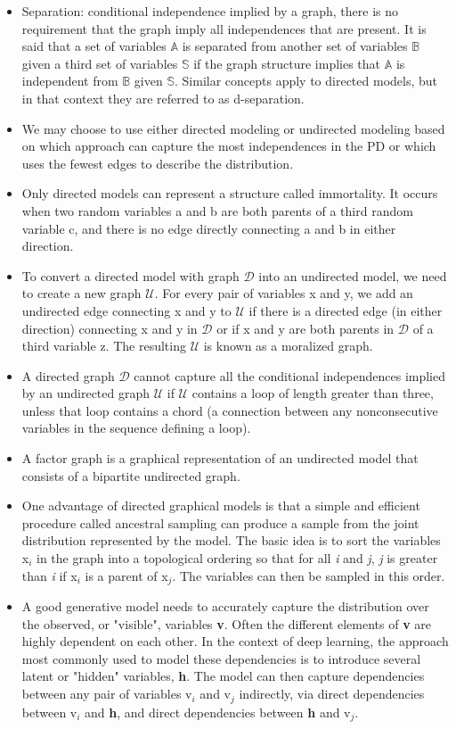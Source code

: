 \documentclass{article}
\begin{document}
\begin{itemize}
\item Separation: conditional independence implied by a graph, there is no requirement that the graph imply all independences that are present. It is said that a set of variables \(\mathbb{A}\) is separated from another set of variables \(\mathbb{B}\) given a third set of variables \(\mathbb{S}\) if the graph structure implies that \(\mathbb{A}\) is independent from \(\mathbb{B}\) given \(\mathbb{S}\). Similar concepts apply to directed models, but in that context they are referred to as d-separation.
\item We may choose to use either directed modeling or undirected modeling based on which approach can capture the most independences in the PD or which uses the fewest edges to describe the distribution.
\item Only directed models can represent a structure called immortality. It occurs when two random variables a and b are both parents of a third random variable c, and there is no edge directly connecting a and b in either direction.
\item To convert a directed model with graph \(\mathcal{D}\) into an undirected model, we need to create a new graph \(\mathcal{U}\). For every pair of variables x and y, we add an undirected edge connecting x and y to \(\mathcal{U}\) if there is a directed edge (in either direction) connecting x and y in \(\mathcal{D}\) or if x and y are both parents in \(\mathcal{D}\) of a third variable z. The resulting \(\mathcal{U}\) is known as a moralized graph.
\item A directed graph \(\mathcal{D}\) cannot capture all the conditional independences implied by an undirected graph \(\mathcal{U}\) if \(\mathcal{U}\) contains a loop of length greater than three, unless that loop contains a chord (a connection between any nonconsecutive variables in the sequence defining a loop).
\item A factor graph is a graphical representation of an undirected model that consists of a bipartite undirected graph.
\item One advantage of directed graphical models is that a simple and efficient procedure called ancestral sampling can produce a sample from the joint distribution represented by the model. The basic idea is to sort the variables x\(_i\) in the graph into a topological ordering so that for all \textit{i} and \textit{j}, \textit{j} is greater than \textit{i} if x\(_i\) is a parent of x\(_j\). The variables can then be sampled in this order.
\item A good generative model needs to accurately capture the distribution over the observed, or "visible", variables \textbf{v}. Often the different elements of \textbf{v} are highly dependent on each other. In the context of deep learning, the approach most commonly used to model these dependencies is to introduce several latent or "hidden" variables, \textbf{h}. The model can then capture dependencies between any pair of variables v\(_i\) and v\(_j\) indirectly, via direct dependencies between v\(_i\) and \textbf{h}, and direct dependencies between \textbf{h} and v\(_j\).

\end{itemize}
\end{document}

